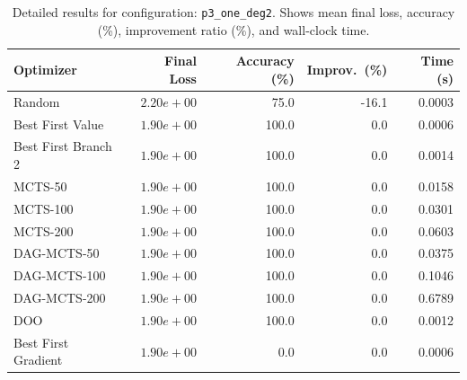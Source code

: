 \begin{table}[H]
\centering
\caption{Detailed results for configuration: \texttt{p3\_one\_deg2}. Shows mean final loss, accuracy (\%), improvement ratio (\%), and wall-clock time.}
\label{tab:funclearn-detail-13}
\begin{tabular}{lrrrr}
\toprule
Optimizer & Final Loss & Accuracy (\%) & Improv.~(\%) & Time (s) \\
\midrule
Random & $2.20e+00$ & 75.0 & -16.1 & 0.0003 \\
\hline
Best First Value & \textbf{$1.90e+00$} & 100.0 & 0.0 & 0.0006 \\
\hline
Best First Branch 2 & \textbf{$1.90e+00$} & 100.0 & 0.0 & 0.0014 \\
\hline
MCTS-50 & \textbf{$1.90e+00$} & 100.0 & 0.0 & 0.0158 \\
\hline
MCTS-100 & \textbf{$1.90e+00$} & 100.0 & 0.0 & 0.0301 \\
\hline
MCTS-200 & \textbf{$1.90e+00$} & 100.0 & 0.0 & 0.0603 \\
\hline
DAG-MCTS-50 & \textbf{$1.90e+00$} & 100.0 & 0.0 & 0.0375 \\
\hline
DAG-MCTS-100 & \textbf{$1.90e+00$} & 100.0 & 0.0 & 0.1046 \\
\hline
DAG-MCTS-200 & \textbf{$1.90e+00$} & 100.0 & 0.0 & 0.6789 \\
\hline
DOO & \textbf{$1.90e+00$} & 100.0 & 0.0 & 0.0012 \\
\hline
Best First Gradient & \textbf{$1.90e+00$} & 0.0 & 0.0 & 0.0006 \\
\bottomrule
\end{tabular}
\end{table}

